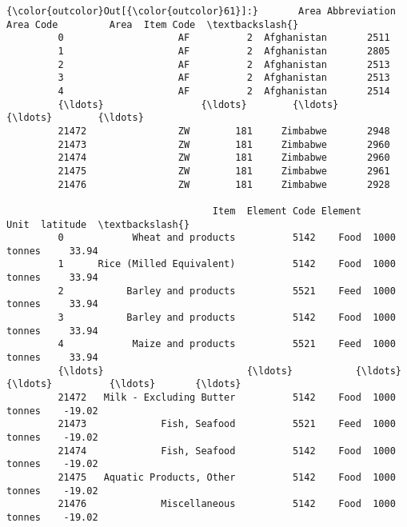 \documentclass[11pt]{article}
\begin{document}
\begin{Verbatim}[commandchars=\\\{\}]
{\color{outcolor}Out[{\color{outcolor}61}]:}       Area Abbreviation  Area Code         Area  Item Code  \textbackslash{}
         0                    AF          2  Afghanistan       2511   
         1                    AF          2  Afghanistan       2805   
         2                    AF          2  Afghanistan       2513   
         3                    AF          2  Afghanistan       2513   
         4                    AF          2  Afghanistan       2514   
         {\ldots}                 {\ldots}        {\ldots}          {\ldots}        {\ldots}   
         21472                ZW        181     Zimbabwe       2948   
         21473                ZW        181     Zimbabwe       2960   
         21474                ZW        181     Zimbabwe       2960   
         21475                ZW        181     Zimbabwe       2961   
         21476                ZW        181     Zimbabwe       2928   
         
                                    Item  Element Code Element         Unit  latitude  \textbackslash{}
         0            Wheat and products          5142    Food  1000 tonnes     33.94   
         1      Rice (Milled Equivalent)          5142    Food  1000 tonnes     33.94   
         2           Barley and products          5521    Feed  1000 tonnes     33.94   
         3           Barley and products          5142    Food  1000 tonnes     33.94   
         4            Maize and products          5521    Feed  1000 tonnes     33.94   
         {\ldots}                         {\ldots}           {\ldots}     {\ldots}          {\ldots}       {\ldots}   
         21472   Milk - Excluding Butter          5142    Food  1000 tonnes    -19.02   
         21473             Fish, Seafood          5521    Feed  1000 tonnes    -19.02   
         21474             Fish, Seafood          5142    Food  1000 tonnes    -19.02   
         21475   Aquatic Products, Other          5142    Food  1000 tonnes    -19.02   
         21476             Miscellaneous          5142    Food  1000 tonnes    -19.02   
         

\end{Verbatim}
\end{document}
